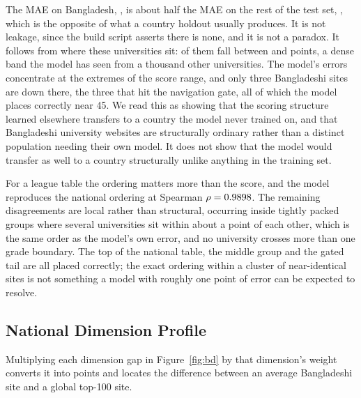 \documentclass[11pt,a4paper]{article}
\begin{document}
\noindent The MAE on Bangladesh, \bdMAE{}, is about half the MAE on the rest of the test set,
\bdRestMAE{}, which is the opposite of what a country holdout usually produces. It is not leakage,
since the build script asserts there is none, and it is not a paradox. It follows from where these
\nBD{} universities sit: \bdBandN{} of them fall between \bdBandLo{} and \bdBandHi{} points, a dense
band the model has seen from a thousand other universities. The model's errors concentrate at the
extremes of the score range, and only three Bangladeshi sites are down there, the three that hit the
navigation gate, all of which the model places correctly near 45. We read this as showing that the
scoring structure learned elsewhere transfers to a country the model never trained on, and that
Bangladeshi university websites are structurally ordinary rather than a distinct population needing
their own model. It does not show that the model would transfer as well to a country structurally
unlike anything in the training set.

For a league table the ordering matters more than the score, and the model reproduces the national
ordering at Spearman $\rho = 0.9898{}$. The remaining disagreements are local rather than
structural, occurring inside tightly packed groups where several universities sit within about a point
of each other, which is the same order as the model's own error, and no university crosses more than
one grade boundary. The top of the national table, the middle group and the gated tail are all placed
correctly; the exact ordering within a cluster of near-identical sites is not something a model with
roughly one point of error can be expected to resolve.

\subsection{National Dimension Profile}

Multiplying each dimension gap in Figure~\ref{fig:bd} by that dimension's weight converts it into
points and locates the difference between an average Bangladeshi site and a global top-100 site.

\begin{table}[H]\centering\small
\caption{Mean sub-score of the \nBD{} Bangladeshi universities against the full dataset and against
the global top 100. The last two columns convert the gap into points of final score.}

\end{table}
\end{document}
